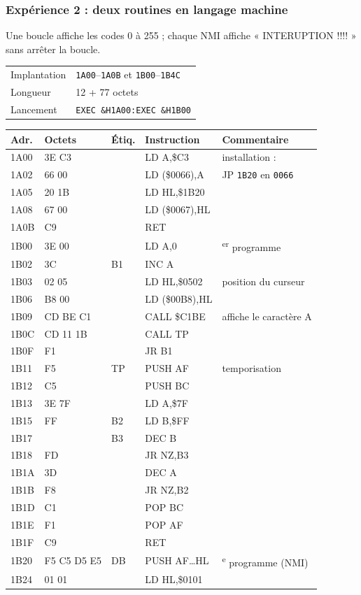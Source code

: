 \documentclass[a4paper,10pt]{article}
\makeatletter
\newcommand{\hex}[1]{\texttt{#1}}
\newcommand{\fiche}[3]{%
  \begin{center}\small
  \begin{tabular}{@{}ll@{}}
  \toprule
  Implantation & #1 \\
  Longueur & #2 \\
  Lancement & #3 \\
  \bottomrule
  \end{tabular}
  \end{center}}
\newenvironment{asm}
  {\small\begin{longtable}{@{}>{\ttfamily}l>{\ttfamily}l>{\ttfamily}l>{\ttfamily}l>{\raggedright\arraybackslash}p{6.2cm}@{}}
   \toprule
   \normalfont\bfseries Adr. & \normalfont\bfseries Octets & \normalfont\bfseries Étiq. & \normalfont\bfseries Instruction & \textbf{Commentaire}\\
   \midrule\endhead
   \bottomrule\endfoot}
  {\end{longtable}}
\makeatother
\begin{document}
\subsubsection*{Expérience 2 : deux routines en langage machine}
Une boucle affiche les codes 0 à 255 ; chaque NMI affiche
« INTERUPTION !!!! » sans arrêter la boucle.
\fiche{\hex{1A00}--\hex{1A0B} et \hex{1B00}--\hex{1B4C}}{12 + 77 octets}{\texttt{EXEC \&H1A00:EXEC \&H1B00}}
\begin{asm}
1A00 & 3E C3    & & LD A,\$C3      & installation : \\
1A02 & 32 66 00 & & LD (\$0066),A  & JP \hex{1B20} en \hex{0066} \\
1A05 & 21 20 1B & & LD HL,\$1B20   & \\
1A08 & 22 67 00 & & LD (\$0067),HL & \\
1A0B & C9       & & RET            & \\
1B00 & 3E 00    & & LD A,0         & 1\textsuperscript{er} programme \\
1B02 & 3C       & B1 & INC A       & \\
1B03 & 21 02 05 & & LD HL,\$0502   & position du curseur \\
1B06 & 22 B8 00 & & LD (\$00B8),HL & \\
1B09 & CD BE C1 & & CALL \$C1BE    & affiche le caractère A \\
1B0C & CD 11 1B & & CALL TP        & \\
1B0F & 18 F1    & & JR B1          & \\
1B11 & F5       & TP & PUSH AF     & temporisation \\
1B12 & C5       & & PUSH BC        & \\
1B13 & 3E 7F    & & LD A,\$7F      & \\
1B15 & 06 FF    & B2 & LD B,\$FF   & \\
1B17 & 05       & B3 & DEC B       & \\
1B18 & 20 FD    & & JR NZ,B3       & \\
1B1A & 3D       & & DEC A          & \\
1B1B & 20 F8    & & JR NZ,B2       & \\
1B1D & C1       & & POP BC         & \\
1B1E & F1       & & POP AF         & \\
1B1F & C9       & & RET            & \\
1B20 & F5 C5 D5 E5 & DB & PUSH AF\dots HL & 2\textsuperscript{e} programme (NMI) \\
1B24 & 21 01 01 & & LD HL,\$0101   & \\

\end{asm}
\end{document}
